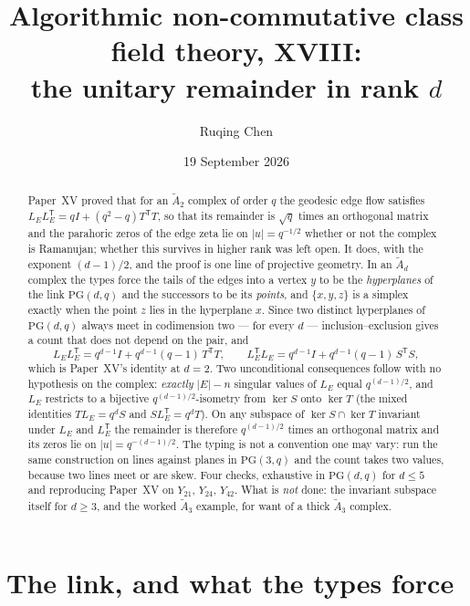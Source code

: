 \documentclass[11pt]{amsart}
\title[Algorithmic non-commutative class field theory, XVIII]
{Algorithmic non-commutative class field theory, XVIII:\\
the unitary remainder in rank $d$}
\author{Ruqing Chen}
\date{19 September 2026}
\numberwithin{equation}{section}
\theoremstyle{definition}
\theoremstyle{remark}
\newcommand{\Atilde}[1]{\widetilde A_{#1}}
\newcommand{\LE}{L_{E}}
\newcommand{\PG}{\mathrm{PG}}
\begin{document}
\begin{abstract}
Paper~XV proved that for an $\Atilde2$ complex of order $q$ the geodesic edge flow
satisfies $\LE\LE^{\mathsf T}=qI+(q^2-q)T^{\mathsf T}T$, so that its remainder is
$\sqrt q$ times an orthogonal matrix and the parahoric zeros of the edge zeta lie on
$|u|=q^{-1/2}$ whether or not the complex is Ramanujan; whether this survives in higher
rank was left open. It does, with the exponent $(d-1)/2$, and the proof is one line of
projective geometry. In an $\Atilde d$ complex the types force the tails of the edges into
a vertex $y$ to be the \emph{hyperplanes} of the link $\PG(d,q)$ and the successors to be
its \emph{points}, and $\{x,y,z\}$ is a simplex exactly when the point $z$ lies in the
hyperplane $x$. Since two distinct hyperplanes of $\PG(d,q)$ always meet in codimension
two --- for every $d$ --- inclusion--exclusion gives a count that does not depend on the
pair, and
\[
\LE\LE^{\mathsf T}=q^{d-1}I+q^{d-1}(q-1)\,T^{\mathsf T}T,\qquad
\LE^{\mathsf T}\LE=q^{d-1}I+q^{d-1}(q-1)\,S^{\mathsf T}S,
\]
which is Paper~XV's identity at $d=2$. Two unconditional consequences follow with no
hypothesis on the complex: \emph{exactly} $|E|-n$ singular values of $\LE$ equal
$q^{(d-1)/2}$, and $\LE$ restricts to a bijective $q^{(d-1)/2}$-isometry from $\ker S$ onto
$\ker T$ (the mixed identities $T\LE=q^{d}S$ and $S\LE^{\mathsf T}=q^{d}T$). On any
subspace of $\ker S\cap\ker T$ invariant under $\LE$ and $\LE^{\mathsf T}$ the remainder
is therefore $q^{(d-1)/2}$ times an orthogonal matrix and its zeros lie on
$|u|=q^{-(d-1)/2}$. The typing is not a convention one may vary: run the same construction
on lines against planes in $\PG(3,q)$ and the count takes two values, because two lines
meet or are skew. Four checks, exhaustive in $\PG(d,q)$ for $d\le5$ and reproducing
Paper~XV on $Y_{21}$, $Y_{24}$, $Y_{42}$. What is \emph{not} done: the invariant subspace
itself for $d\ge3$, and the worked $\Atilde3$ example, for want of a thick $\Atilde3$
complex.
\end{abstract}

\maketitle

\section{The link, and what the types force}\label{sec:link}
\end{document}

